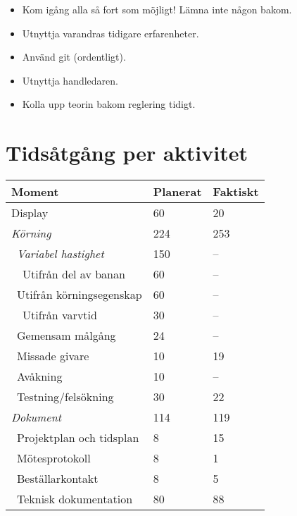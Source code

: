 \documentclass[10pt,oneside,swedish]{lips}
\begin{document}
\begin{itemize}
	\item Kom igång alla så fort som möjligt! Lämna inte någon bakom.
	\item Utnyttja varandras tidigare erfarenheter.
	\item Använd git (ordentligt).
	\item Utnyttja handledaren.
	\item Kolla upp teorin bakom reglering tidigt.
\end{itemize}
\appendix
\section{Tidsåtgång per aktivitet}

\begin{tabular}{|l|l|l|} \hline
	\textbf{Moment}                      & \textbf{Planerat}    & \textbf{Faktiskt}    \\\hline
Display                     &          60 &          20 \\\hline
\emph{Körning}                    &         224 &         253 \\\hline
  \ \emph{Variabel hastighet}        &         150 &           -- \\\hline
    \ \ Utifrån del av banan    &          60 &           -- \\\hline
    \ \ Utifrån körningsegenskap&          60 &         -- \\\hline
    \ \ Utifrån varvtid         &          30 &           -- \\\hline
  \ Gemensam målgång          &          24 &           -- \\\hline
  \ Missade givare            &          10 &          19 \\\hline
  \ Avåkning                  &          10 &           -- \\\hline
  \ Testning/felsökning       &          30 &          22 \\\hline
\emph{Dokument}                    &         114 &           119 \\\hline
  \ Projektplan och tidsplan  &           8 &          15 \\\hline
  \ Mötesprotokoll            &           8 &           1 \\\hline
  \ Beställarkontakt          &           8 &           5 \\\hline
  \ Teknisk dokumentation     &          80 &          88 \\\hline

\end{tabular}
\end{document}
